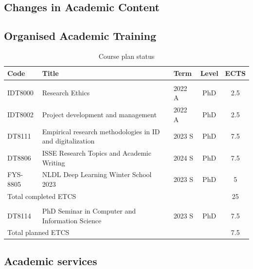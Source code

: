 \documentclass{article}
\begin{document}
\subsection{Changes in Academic Content}


\subsection{Organised Academic Training}


\begin{table}[htp]
    \newcommand\T{\rule{0pt}{2.6ex}}       %
    \newcommand\B{\rule[-1.2ex]{0pt}{0pt}} %
    \centering
    \caption{Course plan status}
    \label{tab:my_label}
    
    \begin{tabularx}{\textwidth}{Xllcc}
        \toprule
        \textbf{Code} & \textbf{Title} & \textbf{Term} & \textbf{Level} & \textbf{ECTS}\\
        \midrule
        \multicolumn{5}{l}{\cellcolor{green!20}{\textbf{Completed}}} \bigstrut\\
        \T IDT8000 & Research Ethics & 2022 A & PhD & 2.5\\
        IDT8002 & Project development and management & 2022 A & PhD & 2.5\\
        DT8111 & Empirical research methodologies in ID and digitalization & 2023 S & PhD & 7.5\\
        DT8806 & ISSE Research Topics and Academic Writing & 2024 S & PhD & 7.5\\
        FYS-8805 & NLDL Deep Learning Winter School 2023 & 2023 S & PhD & 5\\
        \midrule
        \multicolumn{4}{l}{Total completed ETCS} & 25\\
        \midrule
        \midrule
        \multicolumn{5}{l}{\cellcolor{yellow!20}{\textbf{Planned}}} \bigstrut\\
        \T DT8114 & PhD Seminar in Computer and Information Science & 2023 S & PhD & 7.5\\
        \midrule
        \multicolumn{4}{l}{Total planned ETCS} & 7.5\\
        \midrule
        \bottomrule
    \end{tabularx}
\end{table}


\subsection{Academic services}
\end{document}
